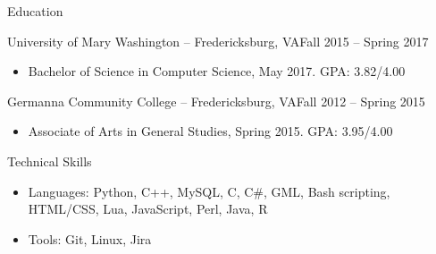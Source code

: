 \documentclass[calibri]{mcdowellcv}
\begin{document}
	\begin{cvsection}{Education}
		\begin{cvsubsection}{University of Mary Washington -- Fredericksburg, VA}{Fall 2015 -- Spring 2017}
			\begin{itemize}
				\item Bachelor of Science in Computer Science, May 2017. GPA: 3.82/4.00
			\end{itemize}
		\end{cvsubsection}
		\begin{cvsubsection}{Germanna Community College -- Fredericksburg, VA}{Fall 2012 -- Spring 2015}
			\begin{itemize}
				\item Associate of Arts in General Studies, Spring 2015. GPA: 3.95/4.00
			\end{itemize}
		\end{cvsubsection}
	\end{cvsection}
	
	\begin{cvsection}{Technical Skills}
		\begin{cvsubsection}{}{}{}	
			\begin{itemize}
				\item Languages: Python, C++, MySQL, C, C\#, GML, Bash scripting, HTML/CSS, Lua, JavaScript, Perl, Java, R 
				\item Tools: Git, Linux, Jira
			\end{itemize}
		\end{cvsubsection}
	\end{cvsection}
	
\end{document}
